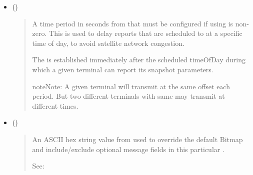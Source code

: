 \documentclass[letterpaper,10pt,english]{sphinxmanual}
\begin{document}
\begin{itemize}
\begin{quote}

\begin{sphinxadmonition}{note}{Note:}
The time of day report will be sent  the measurement, witin a window specified by .
\end{sphinxadmonition}
\end{quote}

\item {} 
 ()
\begin{quote}

A time period in seconds from  that must be configured if using  is non-zero.
This is used to delay reports that are scheduled to  at a specific time of day, to avoid satellite network congestion.

The  is established immediately after the scheduled timeOfDay during which a given terminal can report its snapshot parameters.

\begin{sphinxadmonition}{note}{Note:}
A given terminal will transmit at the same offset each period.  But two different terminals with same  may transmit at different times.
\end{sphinxadmonition}
\end{quote}

\item {} 
 ()
\begin{quote}

An ASCII hex string value from  used to override the default Bitmap and include/exclude optional message fields in this particular .

See: {\hyperref[\detokenize{configuration:msgbitmap}]{}}
\end{quote}

\end{itemize}
\end{document}
